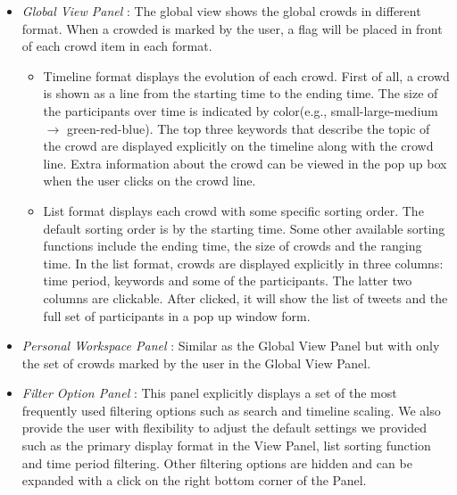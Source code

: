 \documentclass{sig-alternate}
\begin{document}
\begin{itemize}
    \item \textit{Global View Panel} : The global view shows the global crowds
    in different format. When a crowded is marked by the user, a flag will be
    placed in front of each crowd item in each format.

    \begin{itemize}
        \item Timeline format displays the evolution of each crowd.
        First of all, a crowd is shown as a line from the starting time
        to the ending time. The size of the participants over time is
        indicated by color(e.g., small-large-medium $\longrightarrow$
        green-red-blue). The top three keywords that describe the topic of
        the crowd are displayed explicitly on the timeline along with
        the crowd line. Extra information about the crowd can be viewed
        in the pop up box when the user clicks on the crowd line.
        \item List format displays each crowd with some specific
        sorting order. The default sorting order is by the starting
        time. Some other available sorting functions include the
        ending time, the size of crowds and the ranging time. In the
        list format, crowds are displayed explicitly in three columns:
        time period, keywords and some of the participants. The latter
        two columns are clickable. After clicked, it will show the list
        of tweets and the full set of participants in a pop up window
        form.
    \end{itemize}

    \item \textit{Personal Workspace Panel} : Similar as the Global View Panel
    but with only the set of crowds marked by the user in the Global View
    Panel.
    \item \textit{Filter Option Panel} : This panel explicitly displays a set of
    the most frequently used filtering options such as search and timeline scaling.
    We also provide the user with flexibility to adjust the default
    settings we provided such as the primary display format in the View
    Panel, list sorting function and time period filtering. Other filtering
    options are hidden and can be expanded with a click on the right bottom corner
    of the Panel.
\end{itemize}
\end{document}
